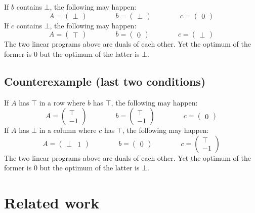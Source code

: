 \documentclass[]{article}
\renewcommand{\.}{\hskip .75pt}
\begin{document}
If $b$ contains $\bot$, the following may happen:
$$
A = \begin{pmatrix} \bot \end{pmatrix}
\qquad \qquad
b = \begin{pmatrix} \bot \end{pmatrix}
\qquad \qquad
c = \begin{pmatrix} 0 \end{pmatrix}
$$
If $c$ contains $\bot$, the following may happen:
$$
A = \begin{pmatrix} \top \end{pmatrix}
\qquad \qquad
b = \begin{pmatrix} 0 \end{pmatrix}
\qquad \qquad
c = \begin{pmatrix} \bot \end{pmatrix}
$$
The two linear programs above are duals of each other.
Yet the optimum of the former is $0$
but the optimum of the latter is $\bot$.

\subsection{Counterexample (last two conditions)}

If $A$ has $\top$ in a row where $b$ has $\top$, the following may happen:
$$
A = \begin{pmatrix} \top \\ -1 \end{pmatrix}
\qquad \qquad
b = \begin{pmatrix} \top \\ -1 \end{pmatrix}
\qquad \qquad
c = \begin{pmatrix} 0 \end{pmatrix}
$$
If $A$ has $\bot$ in a column where $c$ has $\top$, the following may happen:
$$
A = \begin{pmatrix} \bot & 1 \end{pmatrix}
\qquad \qquad
b = \begin{pmatrix} 0 \end{pmatrix}
\qquad \qquad
c = \begin{pmatrix} \top \\ -1 \end{pmatrix}
$$
The two linear programs above are duals of each other.
Yet the optimum of the former is $0$
but the optimum of the latter is $\bot$.


\section {Related work}
\end{document}
